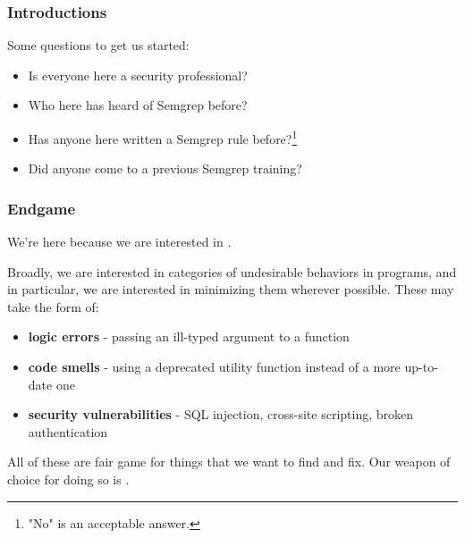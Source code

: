 \documentclass[aspectratio=169, handout]{beamer}
\begin{document}
\begin{frame}[fragile]
  \frametitle{Introductions}

  Some questions to get us started:

  \vspace{5pt}

  \begin{itemize}
    \item Is everyone here a security professional?
    \item Who here has heard of Semgrep before?
    \item Has anyone here written a Semgrep rule before?\footnote{"No" is an acceptable answer.}
    \item Did anyone come to a previous Semgrep training?
  \end{itemize}
\end{frame}


\begin{frame}[fragile]
  \frametitle{Endgame}

  We're here because we are interested in .

  \vspace{5pt}

  Broadly, we are interested in categories of undesirable behaviors in programs, and
  in particular, we are interested in minimizing them wherever possible. These may
  take the form of:

  \vspace{5pt}

  \begin{itemize}
    \item \textbf{logic errors} - passing an ill-typed argument to a function
    \item \textbf{code smells} - using a deprecated utility function instead of a more
    up-to-date one
    \item \textbf{security vulnerabilities} - SQL injection, cross-site scripting, broken authentication
  \end{itemize}

  \vspace{5pt}

  All of these are fair game for things that we want to find and fix. Our weapon of
  choice for doing so is .
\end{frame}
\end{document}
